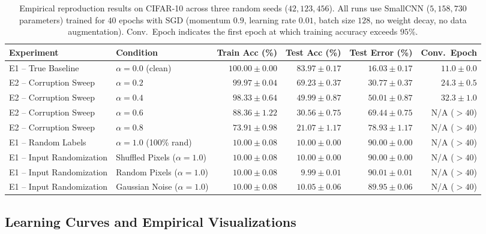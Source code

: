 \documentclass[12pt,a4paper]{article}
\theoremstyle{definition}
\theoremstyle{remark}
\begin{document}
\begin{table}[h]
  \centering
  \caption{%
    Empirical reproduction results on CIFAR-10 across three random seeds ($42, 123, 456$).
    All runs use SmallCNN ($5{,}158{,}730$ parameters) trained for $40$ epochs with SGD (momentum $0.9$, learning rate $0.01$, batch size $128$, no weight decay, no data augmentation).
    Conv.\ Epoch indicates the first epoch at which training accuracy exceeds $95\%$.
  }
  \label{tab:results}
  \small
  \begin{tabular}{llrrrr}
    \toprule
    \textbf{Experiment} & \textbf{Condition} & \textbf{Train Acc (\%)} & \textbf{Test Acc (\%)} & \textbf{Test Error (\%)} & \textbf{Conv.\ Epoch} \\
    \midrule
    E1 -- True Baseline & $\alpha = 0.0$ (clean)    & $100.00 \pm 0.00$ & $83.97 \pm 0.17$ & $16.03 \pm 0.17$ & $11.0 \pm 0.0$ \\
    E2 -- Corruption Sweep & $\alpha = 0.2$          & $99.97 \pm 0.04$  & $69.23 \pm 0.37$ & $30.77 \pm 0.37$ & $24.3 \pm 0.5$ \\
    E2 -- Corruption Sweep & $\alpha = 0.4$          & $98.33 \pm 0.64$  & $49.99 \pm 0.87$ & $50.01 \pm 0.87$ & $32.3 \pm 1.0$ \\
    E2 -- Corruption Sweep & $\alpha = 0.6$          & $88.36 \pm 1.22$  & $30.56 \pm 0.75$ & $69.44 \pm 0.75$ & N/A ($>40$) \\
    E2 -- Corruption Sweep & $\alpha = 0.8$          & $73.91 \pm 0.98$  & $21.07 \pm 1.17$ & $78.93 \pm 1.17$ & N/A ($>40$) \\
    E1 -- Random Labels & $\alpha = 1.0$ (100\% rand) & $10.00 \pm 0.08$  & $10.00 \pm 0.00$ & $90.00 \pm 0.00$ & N/A ($>40$) \\
    \midrule
    E1 -- Input Randomization & Shuffled Pixels ($\alpha=1.0$) & $10.00 \pm 0.08$ & $10.00 \pm 0.00$ & $90.00 \pm 0.00$ & N/A ($>40$) \\
    E1 -- Input Randomization & Random Pixels ($\alpha=1.0$)   & $10.00 \pm 0.08$ & $9.99 \pm 0.01$  & $90.01 \pm 0.01$ & N/A ($>40$) \\
    E1 -- Input Randomization & Gaussian Noise ($\alpha=1.0$)  & $10.00 \pm 0.08$ & $10.05 \pm 0.06$ & $89.95 \pm 0.06$ & N/A ($>40$) \\
    \bottomrule
  \end{tabular}
\end{table}

\subsection{Learning Curves and Empirical Visualizations}
\end{document}
